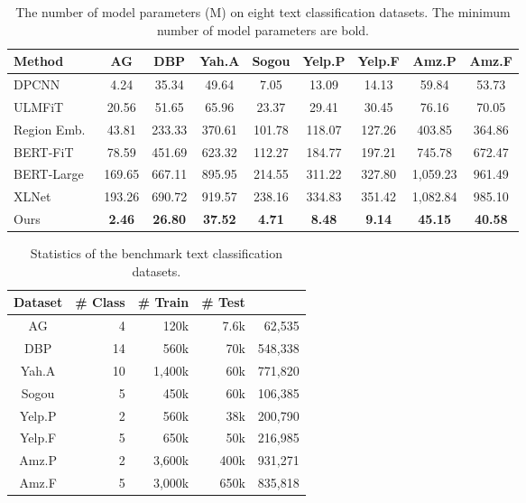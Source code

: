 \documentclass[times,twocolumn,final]{elsarticle}
\begin{document}
\begin{table*}
  \centering
  \caption{The number of model parameters (M) on eight text classification datasets. The minimum number of model parameters are bold.}
  \label{table:sota_parameter}
  \begin{tabular}{l|cccccccc}
    \toprule
    Method  & AG  & DBP  & Yah.A  & Sogou  & Yelp.P  & Yelp.F & Amz.P  & Amz.F \\
    \midrule
    DPCNN~\cite{johnson2017deep}    & 4.24  & 35.34  & 49.64 & 7.05  & 13.09  & 14.13 & 59.84 & 53.73 \\
    ULMFiT~\cite{howard2018universal}    & 20.56  & 51.65  & 65.96 & 23.37  & 29.41  & 30.45 & 76.16 & 70.05 \\
    Region Emb.~\cite{qiao2018new}    & 43.81  & 233.33  & 370.61 & 101.78  & 118.07  & 127.26 & 403.85 & 364.86 \\
    BERT-FiT~\cite{sun2019fine}    & 78.59  & 451.69  & 623.32 & 112.27  & 184.77  & 197.21 & 745.78 & 672.47 \\
    BERT-Large~\cite{xie2020unsupervised}    & 169.65 & 667.11  & 895.95 & 214.55  & 311.22  & 327.80 & 1,059.23 & 961.49 \\
    XLNet~\cite{yang2019xlnet}    & 193.26  & 690.72  & 919.57 & 238.16  & 334.83  & 351.42 & 1,082.84 & 985.10 \\
    \midrule
    Ours    & \textbf{2.46}         & \textbf{26.80}       & \textbf{37.52}      & \textbf{4.71}   & \textbf{8.48}  & \textbf{9.14} & \textbf{45.15} & \textbf{40.58} \\
    \bottomrule
  \end{tabular}
\end{table*}

\begin{table}
  \centering
  \caption{Statistics of the benchmark text classification datasets.}
  \label{table:datasets}
  \begin{tabular}{c|rrrr}
    \toprule
    Dataset   & \# Class  & \# Train & \# Test &  \\
    \midrule
    AG    & 4        & 120k    & 7.6k   & 62,535\\
    DBP   & 14       & 560k    & 70k    & 548,338 \\
    Yah.A  & 10       & 1,400k  & 60k    & 771,820  \\ 
    Sogou   & 5        & 450k    & 60k    & 106,385  \\
    Yelp.P    & 2        & 560k    & 38k    & 200,790  \\
    Yelp.F    & 5        & 650k    & 50k    & 216,985 \\ 
    Amz.P  & 2        & 3,600k  & 400k   & 931,271 \\
    Amz.F  & 5        & 3,000k  & 650k   & 835,818  \\
    \bottomrule
  \end{tabular}
\end{table}
\end{document}
